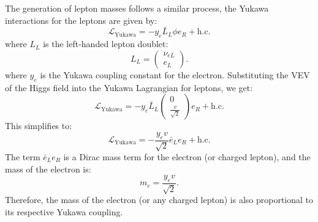             The generation of lepton masses follows a similar process, the Yukawa interactions for the leptons are given by:
            \[
            \mathcal{L}_{\text{Yukawa}} = -y_e \bar{L}_L \phi e_R + \text{h.c.}
            \]
            where \(L_L\) is the left-handed lepton doublet:
            \[
            L_L = \begin{pmatrix} \nu_{eL} \\ e_L \end{pmatrix}.
            \]
            where \(y_e\) is the Yukawa coupling constant for the electron.
            Substituting the VEV of the Higgs field into the Yukawa Lagrangian for leptons, we get:
            \[
            \mathcal{L}_{\text{Yukawa}} = -y_e \bar{L}_L \begin{pmatrix} 0 \\ \frac{v}{\sqrt{2}} \end{pmatrix} e_R + \text{h.c.}
            \]
            This simplifies to:
            \[
            \mathcal{L}_{\text{Yukawa}} = -\frac{y_e v}{\sqrt{2}} \bar{e}_L e_R + \text{h.c.}
            \]
            The term \(\bar{e}_L e_R\) is a Dirac mass term for the electron (or charged lepton), and the mass of the electron is:
            \[
            m_e = \frac{y_e v}{\sqrt{2}}.
            \]
            Therefore, the mass of the electron (or any charged lepton) is also proportional to its respective Yukawa coupling.
